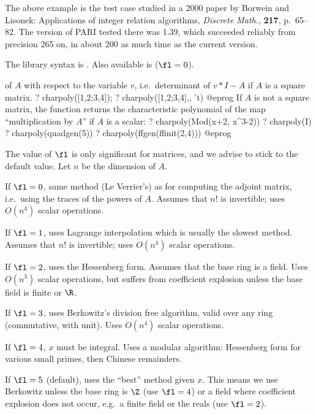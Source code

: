 The above example is the test case studied in a 2000 paper by Borwein and
Lisonek: Applications of integer relation algorithms, \emph{Discrete Math.},
{\bf 217}, p.~65--82. The version of PARI tested there was 1.39, which
succeeded reliably from precision 265 on, in about 200 as much time as the
current version.

The library syntax is .
Also available is  ($\fl=0$).

\label{se:charpoly}
of $A$ with respect to the variable $v$, i.e.~determinant of $v*I-A$ if $A$
is a square matrix.
\bprog
? charpoly([1,2;3,4]);
? charpoly([1,2;3,4],, 't)
@eprog\noindent
If $A$ is not a square matrix, the function returns the characteristic
polynomial of the map ``multiplication by $A$'' if $A$ is a scalar:
\bprog
? charpoly(Mod(x+2, x^3-2))
? charpoly(I)
? charpoly(quadgen(5))
? charpoly(ffgen(ffinit(2,4)))
@eprog

The value of $\fl$ is only significant for matrices, and we advise to stick
to the default value. Let $n$ be the dimension of $A$.

If $\fl=0$, same method (Le Verrier's) as for computing the adjoint matrix,
i.e.~using the traces of the powers of $A$. Assumes that $n!$ is
invertible; uses $O(n^4)$ scalar operations.

If $\fl=1$, uses Lagrange interpolation which is usually the slowest method.
Assumes that $n!$ is invertible; uses $O(n^4)$ scalar operations.

If $\fl=2$, uses the Hessenberg form. Assumes that the base ring is a field.
Uses $O(n^3)$ scalar operations, but suffers from coefficient explosion
unless the base field is finite or $\R$.

If $\fl=3$, uses Berkowitz's division free algorithm, valid over any
ring (commutative, with unit). Uses $O(n^4)$ scalar operations.

If $\fl=4$, $x$ must be integral. Uses a modular algorithm: Hessenberg form
for various small primes, then Chinese remainders.

If $\fl=5$ (default), uses the ``best'' method given $x$.
This means we use Berkowitz unless the base ring is $\Z$ (use $\fl=4$)
or a field where coefficient explosion does not occur,
e.g.~a finite field or the reals (use $\fl=2$).

